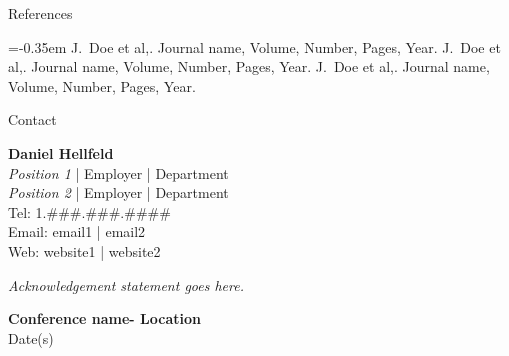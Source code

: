 \documentclass[a0paper,portrait]{baposter}
\newcommand{\fullme}{Daniel Hellfeld}
\newcommand{\positionA}{Position 1}
\newcommand{\employerA}{Employer | Department}
\newcommand{\positionB}{Position 2}
\newcommand{\employerB}{Employer | Department}
\newcommand{\phone}{1.\#\#\#.\#\#\#.\#\#\#\# }
\newcommand{\emails}{email1 | email2}
\newcommand{\websites}{website1 | website2}
\newcommand{\conferencename}{Conference name}
\newcommand{\conferencelocation}{Location}
\newcommand{\conferencedates}{Date(s)}
\begin{document}
\begin{poster}
\begin{posterbox}[name=refs,column=2,below=box6, height=0.158]{References}
\begin{thebibliography}{1} 

\itemsep=-0.35em  %
\scriptsize
\bibitem{} J.~Doe et al,. Journal name, Volume, Number, Pages, Year.
\bibitem{} J.~Doe et al,. Journal name, Volume, Number, Pages, Year.
\bibitem{} J.~Doe et al,. Journal name, Volume, Number, Pages, Year.
\end{thebibliography}

\end{posterbox}





\begin{posterbox}[name=contact,column=2,below=refs, height=0.079]{Contact}

\vspace{0.1em}
\textbf{\fullme} \\[0.2em]
\scriptsize{
\emph{\positionA} | \employerA \\
\emph{\positionB} | \employerB \\
Tel: \phone \\
Email: \emails \\
Web: \websites
}\par
\end{posterbox}





\begin{posterbox}[name=ack,column=1,span=2,below=box5, above=bottom, headerColorOne=aaublue3, borderColor=aaublue3, boxColorOne=aaublue3, boxheaderheight=-1em]{}

\scriptsize{
\emph{Acknowledgement statement goes here.}
}\par
\end{posterbox}




\begin{posterbox}[name=titledate,column=0,span=1,below=box5, above=bottom, headerColorOne=aaublue3, borderColor=aaublue3, boxColorOne=aaublue3, boxheaderheight=-1em]{}

\begin{center}
\textbf{\conferencename - \conferencelocation} \\
\conferencedates
\end{center}

\end{posterbox}



\end{poster}
\end{document}
